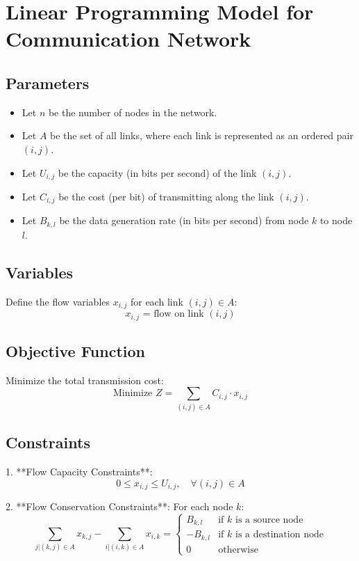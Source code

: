 \documentclass{article}
\begin{document}
\section*{Linear Programming Model for Communication Network}

\subsection*{Parameters}
\begin{itemize}
    \item Let \( n \) be the number of nodes in the network.
    \item Let \( A \) be the set of all links, where each link is represented as an ordered pair \( (i, j) \).
    \item Let \( U_{i,j} \) be the capacity (in bits per second) of the link \( (i, j) \).
    \item Let \( C_{i,j} \) be the cost (per bit) of transmitting along the link \( (i, j) \).
    \item Let \( B_{k,l} \) be the data generation rate (in bits per second) from node \( k \) to node \( l \).
\end{itemize}

\subsection*{Variables}
Define the flow variables \( x_{i,j} \) for each link \( (i, j) \in A \):
\[
x_{i,j} \text{ = flow on link } (i, j)
\]

\subsection*{Objective Function}
Minimize the total transmission cost:
\[
\text{Minimize } Z = \sum_{(i,j) \in A} C_{i,j} \cdot x_{i,j}
\]

\subsection*{Constraints}

1. **Flow Capacity Constraints**:
   \[
   0 \leq x_{i,j} \leq U_{i,j}, \quad \forall (i,j) \in A
   \]

2. **Flow Conservation Constraints**:
   For each node \( k \):
   \[
   \sum_{j | (k,j) \in A} x_{k,j} - \sum_{i | (i,k) \in A} x_{i,k} = 
   \begin{cases} 
   B_{k,l} & \text{if } k \text{ is a source node} \\
   -B_{k,l} & \text{if } k \text{ is a destination node} \\
   0 & \text{otherwise}
   \end{cases}
   \]
\end{document}
